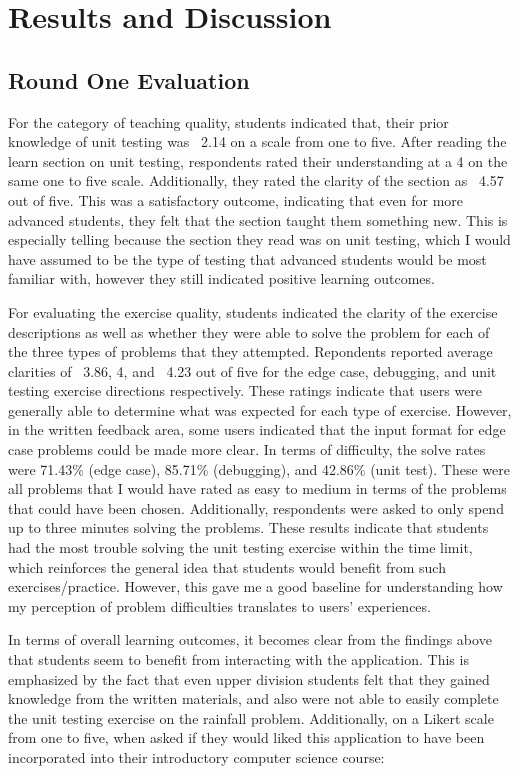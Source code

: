 \documentclass[10pt,twocolumn]{article}
\begin{document}
\section{Results and Discussion}

\subsection{Round One Evaluation}

For the category of teaching quality, students indicated that, their 
prior knowledge of unit testing was ~2.14 on a scale from one to five. After reading the learn section on unit testing, 
respondents rated their understanding at a 4 on the same one to five scale. Additionally, they rated the clarity of the 
section as ~4.57 out of five. This was a satisfactory outcome, indicating that even for more advanced students, they felt 
that the section taught them something new. This is especially telling because the section they read was on unit testing, 
which I would have assumed to be the type of testing that advanced students would be most familiar with, however they still
indicated positive learning outcomes. 

For evaluating the exercise quality, students indicated the clarity of the exercise descriptions as well as whether they 
were able to solve the problem for
each of the three types of problems that they attempted. Repondents reported average clarities of ~3.86, 4, and ~4.23 out 
of five for the edge case, debugging, and unit testing exercise directions respectively. These ratings indicate that users 
were generally able to determine what was expected for each type of exercise. However, in the written feedback area, some 
users indicated that the input format for edge case problems could be made more clear. In terms of difficulty, the solve 
rates were 71.43\% (edge case), 85.71\% (debugging), and 42.86\% (unit test). These were all problems that I would have 
rated as easy to medium in terms of the problems that could have been chosen. Additionally, respondents were asked to only 
spend up to three minutes solving the problems. These results indicate that students had the most trouble solving the 
unit testing exercise within the time limit, which reinforces the general idea that students would benefit from such 
exercises/practice. However, this gave me a good baseline for understanding how my perception of problem difficulties 
translates to users' experiences.

In terms of overall learning outcomes, it becomes clear from the findings above that students seem to benefit from interacting 
with the application. This is emphasized by the fact that even upper division students felt that they gained knowledge from 
the written materials, and also were not able to easily complete the unit testing exercise on the rainfall problem. Additionally,
on a Likert scale from one to five, when asked if they would liked this application to have been incorporated into their 
introductory computer science course:
\end{document}
